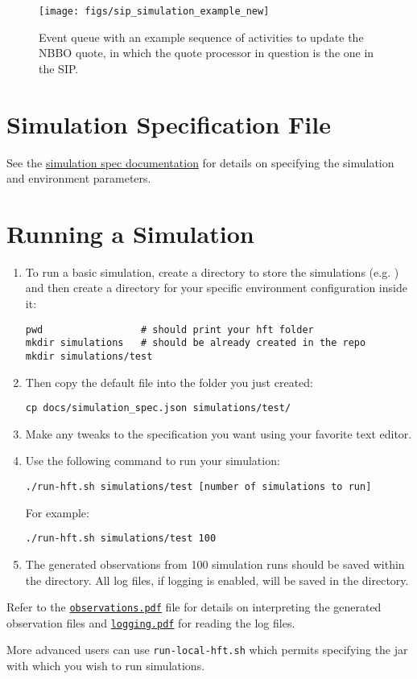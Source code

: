 \documentclass[11pt]{article}
\begin{document}
\begin{figure}
\texttt{[image: figs/sip\_simulation\_example\_new]}
\caption{Event queue with an example sequence of activities to update the NBBO quote, in which the quote processor in question is the one in the SIP.}
\label{fig:sim-sys}
\end{figure}

\section{Simulation Specification File}

See the \href{simulation_spec.pdf}{simulation spec documentation} for details on specifying the simulation and environment parameters.

\section{Running a Simulation}

\begin{enumerate}
\item To run a basic simulation, create a directory to store the
  simulations (e.g. ) and then create a directory for your
  specific environment configuration inside it:
%
\begin{verbatim}
pwd                 # should print your hft folder
mkdir simulations   # should be already created in the repo
mkdir simulations/test
\end{verbatim}

\item Then copy the default  file into the folder you just created:
%
\begin{verbatim}
cp docs/simulation_spec.json simulations/test/
\end{verbatim}

\item Make any tweaks to the specification you want using your favorite text editor.

\item Use the following command to run your simulation:
%
\begin{verbatim}
./run-hft.sh simulations/test [number of simulations to run]
\end{verbatim}

For example:
\begin{verbatim}
./run-hft.sh simulations/test 100
\end{verbatim}

\item The generated observations from 100 simulation runs should be saved within the  directory. All log files, if logging is enabled, will be saved in the  directory.

\end{enumerate}

Refer to the \href{observations.pdf}{\texttt{observations.pdf}} file for details on interpreting the generated observation files and \href{logging.pdf}{\texttt{logging.pdf}} for reading the log files.

More advanced users can use \verb|run-local-hft.sh| which permits specifying the jar with which you wish to run simulations.
\end{document}
